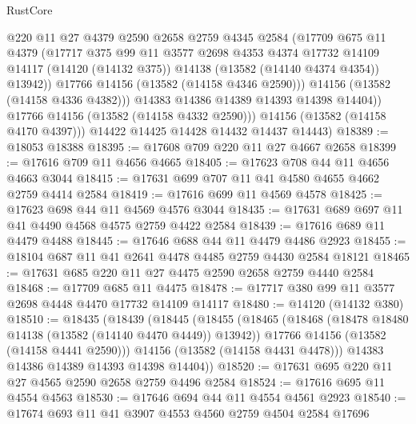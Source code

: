 \begin{lexlean}{RustCore}
\begin{coremodule}
                  @220
                  @11
                  @27
                  @4379
                  @2590
                  @2658
                  @2759
                  @4345
                  @2584
                  (@17709
                    @675
                    @11
                    @4379
                    (@17717
                      @375
                      @99
                      @11
                      @3577
                      @2698
                      @4353
                      @4374
                      @17732
                      @14109
                      @14117
                      (@14120 (@14132 @375))
                      @14138
                      (@13582 (@14140 @4374 @4354))
                      @13942))
                  @17766
                  @14156
                  (@13582 (@14158 @4346 @2590)))
                @14156
                (@13582 (@14158 @4336 @4382)))
              @14383
              @14386
              @14389
              @14393
              @14398
              @14404))
          @17766
          @14156
          (@13582 (@14158 @4332 @2590)))
        @14156
        (@13582 (@14158 @4170 @4397)))
      @14422
      @14425
      @14428
      @14432
      @14437
      @14443)
@18389 := @18053 @18388
@18395 := @17608 @709 @220 @11 @27 @4667 @2658
@18399 := @17616 @709 @11 @4656 @4665
@18405 := @17623 @708 @44 @11 @4656 @4663 @3044
@18415 := @17631 @699 @707 @11 @41 @4580 @4655 @4662 @2759 @4414 @2584
@18419 := @17616 @699 @11 @4569 @4578
@18425 := @17623 @698 @44 @11 @4569 @4576 @3044
@18435 := @17631 @689 @697 @11 @41 @4490 @4568 @4575 @2759 @4422 @2584
@18439 := @17616 @689 @11 @4479 @4488
@18445 := @17646 @688 @44 @11 @4479 @4486 @2923
@18455 := @18104 @687 @11 @41 @2641 @4478 @4485 @2759 @4430 @2584 @18121
@18465 := @17631 @685 @220 @11 @27 @4475 @2590 @2658 @2759 @4440 @2584
@18468 := @17709 @685 @11 @4475
@18478 := @17717 @380 @99 @11 @3577 @2698 @4448 @4470 @17732 @14109 @14117
@18480 := @14120 (@14132 @380)
@18510 := @18435
    (@18439
      (@18445
        (@18455
          (@18465
            (@18468 (@18478 @18480 @14138 (@13582 (@14140 @4470 @4449)) @13942))
            @17766
            @14156
            (@13582 (@14158 @4441 @2590)))
          @14156
          (@13582 (@14158 @4431 @4478)))
        @14383
        @14386
        @14389
        @14393
        @14398
        @14404))
@18520 := @17631 @695 @220 @11 @27 @4565 @2590 @2658 @2759 @4496 @2584
@18524 := @17616 @695 @11 @4554 @4563
@18530 := @17646 @694 @44 @11 @4554 @4561 @2923
@18540 := @17674 @693 @11 @41 @3907 @4553 @4560 @2759 @4504 @2584 @17696

\end{coremodule}
\end{lexlean}
